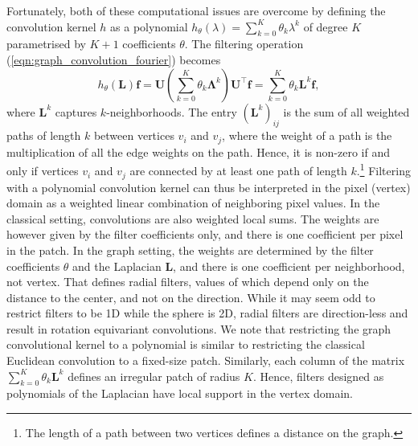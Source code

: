 \documentclass[final,twocolumn,3p,times,sort&compress]{elsarticle}
\newcommand{\eqnref}[1]{(\ref{eqn:#1})}
\renewcommand{\b}[1]{{\bm{#1}}}   %
\newcommand{\1}{\b{1}}              %
\newcommand{\0}{\b{0}}              %
\renewcommand{\L}{\b{L}}
\newcommand{\U}{\b{U}}
\newcommand{\f}{\b{f}}
\newcommand{\trans}{^\intercal}
\newcommand{\bLambda}{\b{\Lambda}}
\begin{document}
Fortunately, both of these computational issues are overcome by defining the convolution kernel $h$ as a polynomial $h_\theta(\lambda) = \sum_{k=0}^K \theta_k \lambda^k$ of degree $K$ parametrised by $K+1$ coefficients $\theta$.
The filtering operation \eqnref{graph_convolution_fourier} becomes
\begin{equation} \label{eqn:graph_convolution_monomial}
	h_\theta(\L) \f =  \U \left(\sum_{k=0}^K \theta_k \bLambda^k \right) \U\trans \f = \sum_{k=0}^K \theta_k \L^k \f,
\end{equation}
where $\L^k$ captures $k$-neighborhoods.
The entry $(\L^k)_{ij}$ is the sum of all weighted paths of length $k$ between vertices $v_i$ and $v_j$, where the weight of a path is the multiplication of all the edge weights on the path.
Hence, it is non-zero if and only if vertices $v_i$ and $v_j$ are connected by at least one path of length $k$.\footnote{The length of a path between two vertices defines a distance on the graph.}
Filtering with a polynomial convolution kernel can thus be interpreted in the pixel (vertex) domain as a weighted linear combination of neighboring pixel values.
In the classical setting, convolutions are also weighted local sums.
The weights are however given by the filter coefficients only, and there is one coefficient per pixel in the patch.
In the graph setting, the weights are determined by the filter coefficients $\theta$ and the Laplacian $\L$, and there is one coefficient per neighborhood, not vertex.
That defines radial filters, values of which depend only on the distance to the center, and not on the direction.
While it may seem odd to restrict filters to be 1D while the sphere is 2D, radial filters are direction-less and result in rotation equivariant convolutions.
We note that restricting the graph convolutional kernel to a polynomial is similar to restricting the classical Euclidean convolution to a fixed-size patch.
Similarly, each column of the matrix $\sum_{k=0}^K \theta_k \L^k$ defines an irregular patch of radius $K$.
Hence, filters designed as polynomials of the Laplacian have local support in the vertex domain.
\end{document}
